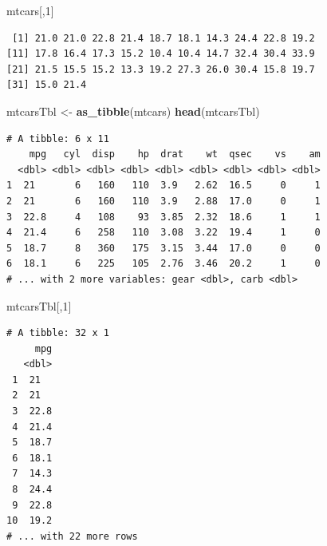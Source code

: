 \documentclass[
]{krantz}
\makeatletter
\newenvironment{Shaded}{\begin{snugshade}}{\end{snugshade}}
\newcommand{\DecValTok}[1]{\textcolor[rgb]{0.06,0.06,0.06}{#1}}
\newcommand{\KeywordTok}[1]{\textcolor[rgb]{0.27,0.27,0.27}{\textbf{#1}}}
\newcommand{\NormalTok}[1]{#1}
\newcommand{\StringTok}[1]{\textcolor[rgb]{0.5,0.5,0.5}{#1}}
\newenvironment{kframe}{%
\medskip{}
\setlength{\fboxsep}{.8em}
 \def\at@end@of@kframe{}%
 \ifinner\ifhmode%
  \def\at@end@of@kframe{\end{minipage}}%
  \begin{minipage}{\columnwidth}%
 \fi\fi%
 \def\FrameCommand##1{\hskip\@totalleftmargin \hskip-\fboxsep
 \colorbox{shadecolor}{##1}\hskip-\fboxsep
     \hskip-\linewidth \hskip-\@totalleftmargin \hskip\columnwidth}%
 \MakeFramed {\advance\hsize-\width
   \@totalleftmargin\z@ \linewidth\hsize
   \@setminipage}}%
 {\par\unskip\endMakeFramed%
 \at@end@of@kframe}
\renewenvironment{Shaded}{\begin{kframe}}{\end{kframe}}
\makeatother
\begin{document}
\begin{Shaded}
\begin{Highlighting}[]
\NormalTok{mtcars[,}\DecValTok{1}\NormalTok{]}
\end{Highlighting}
\end{Shaded}

\begin{verbatim}
 [1] 21.0 21.0 22.8 21.4 18.7 18.1 14.3 24.4 22.8 19.2
[11] 17.8 16.4 17.3 15.2 10.4 10.4 14.7 32.4 30.4 33.9
[21] 21.5 15.5 15.2 13.3 19.2 27.3 26.0 30.4 15.8 19.7
[31] 15.0 21.4
\end{verbatim}

\begin{Shaded}
\begin{Highlighting}[]
\NormalTok{mtcarsTbl \textless{}{-}}\StringTok{ }\KeywordTok{as\_tibble}\NormalTok{(mtcars)}
\KeywordTok{head}\NormalTok{(mtcarsTbl)}
\end{Highlighting}
\end{Shaded}

\begin{verbatim}
# A tibble: 6 x 11
    mpg   cyl  disp    hp  drat    wt  qsec    vs    am
  <dbl> <dbl> <dbl> <dbl> <dbl> <dbl> <dbl> <dbl> <dbl>
1  21       6   160   110  3.9   2.62  16.5     0     1
2  21       6   160   110  3.9   2.88  17.0     0     1
3  22.8     4   108    93  3.85  2.32  18.6     1     1
4  21.4     6   258   110  3.08  3.22  19.4     1     0
5  18.7     8   360   175  3.15  3.44  17.0     0     0
6  18.1     6   225   105  2.76  3.46  20.2     1     0
# ... with 2 more variables: gear <dbl>, carb <dbl>
\end{verbatim}

\begin{Shaded}
\begin{Highlighting}[]
\NormalTok{mtcarsTbl[,}\DecValTok{1}\NormalTok{]}
\end{Highlighting}
\end{Shaded}

\begin{verbatim}
# A tibble: 32 x 1
     mpg
   <dbl>
 1  21  
 2  21  
 3  22.8
 4  21.4
 5  18.7
 6  18.1
 7  14.3
 8  24.4
 9  22.8
10  19.2
# ... with 22 more rows
\end{verbatim}
\end{document}
